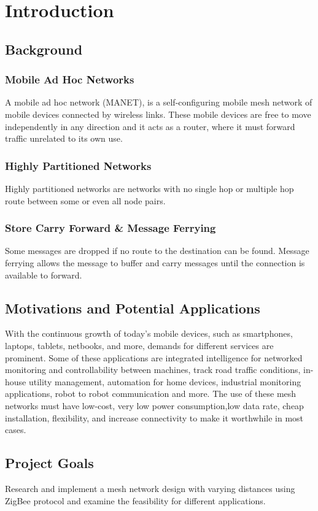 \chapter{Introduction} 

\section{Background}

\subsection{Mobile Ad Hoc Networks}
A mobile ad hoc network (MANET),  is a self-configuring mobile mesh network of mobile devices connected by wireless links.  
These mobile devices are free to move independently in any direction and it acts as a router, where it must forward traffic unrelated to its own use. 

\subsection{Highly Partitioned Networks}
Highly partitioned networks are networks with no single hop or multiple hop route between some or even all node pairs.

\subsection{Store Carry Forward & Message Ferrying}
Some messages are dropped if no route to the destination can be found.  Message ferrying allows the message to buffer and carry messages until the connection is available to forward.

\section{Motivations and Potential Applications}

With the continuous growth of today's mobile devices, such as smartphones, laptops, tablets, netbooks, and more, demands for different services are prominent. 
Some of these applications are integrated intelligence for networked monitoring and controllability between machines, track road traffic conditions, in-house utility management, automation for home devices, industrial monitoring applications, robot to robot communication and more.  The use of these mesh networks must have low-cost, very low power consumption,low data rate, cheap installation, flexibility, and increase connectivity to make it worthwhile in most cases.




\section{Project Goals}
Research and implement a mesh network design with varying distances using ZigBee protocol and examine the feasibility for different applications.